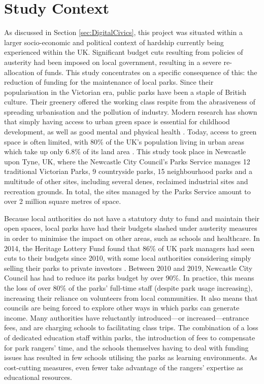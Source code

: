 \section{Study Context}
\label{sec:ParkContext}
As discussed in Section \ref{sec:DigitalCivics}, this project was situated within a larger socio-economic and political context of hardship currently being experienced within the UK. Significant budget cuts resulting from policies of austerity had been imposed on local government, resulting in a severe re-allocation of funds. This study concentrates on a specific consequence of this: the reduction of funding for the maintenance of local parks. Since their popularisation in the Victorian era, public parks have been a staple of British culture. Their greenery offered the working class respite from the abrasiveness of spreading urbanisation and the pollution of industry. Modern research has shown that simply having access to urban green space is essential for childhood development, as well as good mental and physical health \citep{Fiennes2015}. Today, access to green space is often limited, with 80\% of the UK’s population living in urban areas which take up only 6.8\% of its land area \citep{UKNationalEcosystemAssesment2011}. This study took place in Newcastle upon Tyne, UK, where the Newcastle City Council's Parks Service manages 12 traditional Victorian Parks, 9 countryside parks, 15 neighbourhood parks and a multitude of other sites, including several denes, reclaimed industrial sites and recreation grounds. In total, the sites managed by the Parks Service amount to over 2 million square metres of space.

Because local authorities do not have a statutory duty to fund and maintain their open spaces, local parks have had their budgets slashed under austerity measures in order to minimise the impact on other areas, such as schools and healthcare. In 2014, the Heritage Lottery Fund found that 86\% of UK park managers had seen cuts to their budgets since 2010, with some local authorities considering simply selling their parks to private investors \citep{HeritageLotteryFund2014}. Between 2010 and 2019, Newcastle City Council has had to reduce its parks budget by over 90\%. In practice, this means the loss of over 80\% of the parks' full-time staff (despite park usage increasing), increasing their reliance on volunteers from local communities.  It also means that councils are being forced to explore other ways in which parks can generate income. Many authorities have reluctantly introduced---or increased---entrance fees, and are charging schools to facilitating class trips. The combination of a loss of dedicated education staff within parks, the introduction of fees to compensate for park rangers’ time, and the schools themselves having to deal with funding issues has resulted in few schools utilising the parks as learning environments. As cost-cutting measures, even fewer take advantage of the rangers’ expertise as educational resources.

